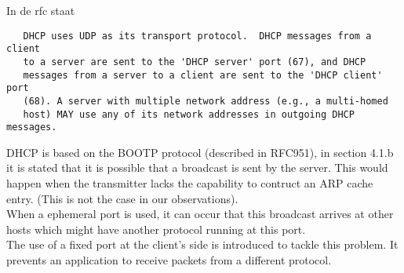 In de rfc staat
\begin{lstlisting}
   DHCP uses UDP as its transport protocol.  DHCP messages from a client
   to a server are sent to the 'DHCP server' port (67), and DHCP
   messages from a server to a client are sent to the 'DHCP client' port
   (68). A server with multiple network address (e.g., a multi-homed
   host) MAY use any of its network addresses in outgoing DHCP messages.
\end{lstlisting}

DHCP is based on the BOOTP protocol (described in RFC951), in section 4.1.b it is stated that it is possible that a broadcast is sent by the server. This would happen when the transmitter lacks the capability to contruct an ARP cache entry. (This is not the case in our observations).\\
When a ephemeral port is used, it can occur that this broadcast arrives at other hosts which might have another protocol running at this port. \\

The use of a fixed port at the client's side is introduced to tackle this problem. It prevents an application to receive packets from a different protocol.